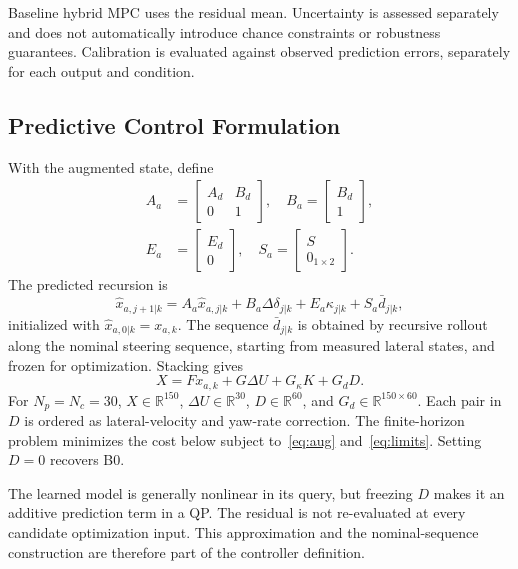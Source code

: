 \documentclass[10pt,journal]{IEEEtran}
\newcommand{\R}{\mathbb{R}}
\begin{document}
Baseline hybrid MPC uses the residual mean. Uncertainty is assessed separately and does not automatically introduce chance constraints or robustness guarantees. Calibration is evaluated against observed prediction errors, separately for each output and condition.

\subsection{Predictive Control Formulation}
With the augmented state, define
\begin{align}
 A_a&=\begin{bmatrix}A_d&B_d\\0&1\end{bmatrix},\quad
 B_a=\begin{bmatrix}B_d\\1\end{bmatrix},\nonumber\\
 E_a&=\begin{bmatrix}E_d\\0\end{bmatrix},\quad
 S_a=\begin{bmatrix}S\\0_{1\times2}\end{bmatrix}.
\end{align}
The predicted recursion is
\begin{equation}
 \hat x_{a,j+1|k}=A_a\hat x_{a,j|k}+B_a\Delta\delta_{j|k}
           +E_a\kappa_{j|k}+S_a\bar d_{j|k},\label{eq:aug}
\end{equation}
initialized with $\hat x_{a,0|k}=x_{a,k}$. The sequence $\bar d_{j|k}$ is obtained by recursive rollout along the nominal steering sequence, starting from measured lateral states, and frozen for optimization. Stacking gives
\begin{equation}
 X=F x_{a,k}+G\Delta U+G_\kappa K+G_dD.\label{eq:stack}
\end{equation}
For $N_p=N_c=30$, $X\in\R^{150}$, $\Delta U\in\R^{30}$, $D\in\R^{60}$, and $G_d\in\R^{150\times60}$. Each pair in $D$ is ordered as lateral-velocity and yaw-rate correction. The finite-horizon problem minimizes the cost below subject to~\eqref{eq:aug} and~\eqref{eq:limits}. Setting $D=0$ recovers B0.

The learned model is generally nonlinear in its query, but freezing $D$ makes it an additive prediction term in a QP. The residual is not re-evaluated at every candidate optimization input. This approximation and the nominal-sequence construction are therefore part of the controller definition.
\end{document}
